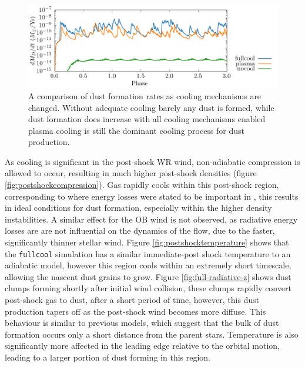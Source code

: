 \begin{figure}
  \centering
  \includegraphics{assets/cool-results/cool-phase-dust_rate.pdf}
  \caption[Comparison of dust formation rates with cooling methods]{A comparison of dust formation rates as cooling mechanisms are changed. Without adequate cooling barely any dust is formed, while dust formation does increase with all cooling mechanisms enabled plasma cooling is still the dominant cooling process for dust production.}
  \label{fig:coolingprocess-dustproduction}
\end{figure}



As cooling is significant in the post-shock WR wind, non-adiabatic compression is allowed to occur, resulting in much higher post-shock densities (figure \ref{fig:postshockcompression}).
Gas rapidly cools within this post-shock region, corresponding to where energy losses were stated to be important in \textcite{usov_stellar_1991}, this results in ideal conditions for dust formation, especially within the higher density instabilities.
A similar effect for the OB wind is not observed, as radiative energy losses are are not influential on the dynamics of the flow, due to the faster, significantly thinner stellar wind.
Figure \ref{fig:postshocktemperature} shows that the \texttt{fullcool} simulation has a similar immediate-post shock temperature to an adiabatic model, however this region cools within an extremely short timescale, allowing the nascent dust grains to grow.
Figure \ref{fig:full-radiative-z} shows dust clumps forming shortly after initial wind collision, these clumps rapidly convert post-shock gas to dust, after a short period of time, however, this dust production tapers off as the post-shock wind becomes more diffuse.
This behaviour is similar to previous models, which suggest that the bulk of dust formation occurs only a short distance from the parent stars.
Temperature is also significantly more affected in the leading edge relative to the orbital motion, leading to a larger portion of dust forming in this region.

